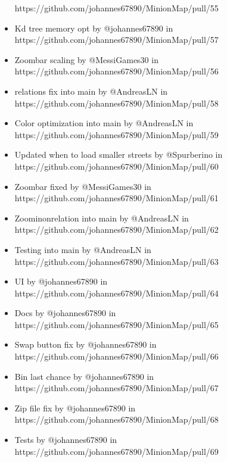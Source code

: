 \begin{itemize}
  https://github.com/johannes67890/MinionMap/pull/55
\item
  Kd tree memory opt by @johannes67890 in\\
  https://github.com/johannes67890/MinionMap/pull/57
\item
  Zoombar scaling by @MessiGames30 in\\
  https://github.com/johannes67890/MinionMap/pull/56
\item
  relations fix into main by @AndreasLN in\\
  https://github.com/johannes67890/MinionMap/pull/58
\item
  Color optimization into main by @AndreasLN in\\
  https://github.com/johannes67890/MinionMap/pull/59
\item
  Updated when to load smaller streets by @Spurberino in\\
  https://github.com/johannes67890/MinionMap/pull/60
\item
  Zoombar fixed by @MessiGames30 in\\
  https://github.com/johannes67890/MinionMap/pull/61
\item
  Zoominonrelation into main by @AndreasLN in\\
  https://github.com/johannes67890/MinionMap/pull/62
\item
  Testing into main by @AndreasLN in\\
  https://github.com/johannes67890/MinionMap/pull/63
\item
  UI by @johannes67890 in\\
  https://github.com/johannes67890/MinionMap/pull/64
\item
  Docs by @johannes67890 in\\
  https://github.com/johannes67890/MinionMap/pull/65
\item
  Swap button fix by @johannes67890 in\\
  https://github.com/johannes67890/MinionMap/pull/66
\item
  Bin last chance by @johannes67890 in\\
  https://github.com/johannes67890/MinionMap/pull/67
\item
  Zip file fix by @johannes67890 in\\
  https://github.com/johannes67890/MinionMap/pull/68
\item
  Tests by @johannes67890 in\\
  https://github.com/johannes67890/MinionMap/pull/69
\end{itemize}

